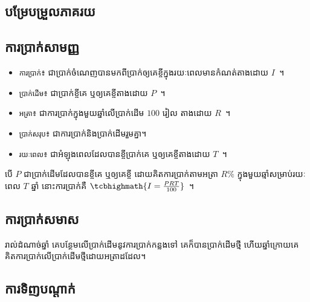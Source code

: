 \documentclass[12pt,a4paper]{pptec}
\begin{document}
    \subsection{បម្រែបម្រួលភាគរយ}
    \subsection{ការប្រាក់សាមញ្ញ}
    \begin{tcolorbox}
        \begin{itemize}
            \item \texttt{ការប្រាក់}៖ ជាប្រាក់ចំណេញបានមកពីប្រាក់ឲ្យគេខ្ចីក្នុងរយៈពេលមានកំណត់តាងដោយ $ I $~។
            \item \texttt{ប្រាក់ដើម}៖ ជាប្រាក់ខ្ចីគេ ឬឲ្យគេខ្ចីតាងដោយ $ P $~។
            \item \texttt{អត្រា}៖ ជាការប្រាក់ក្នុងមួយឆ្នាំលើប្រាក់ដើម $ 100 $ រៀល តាងដោយ $ R $~។
            \item \texttt{ប្រាក់សរុប}៖ ជាការប្រាក់និងប្រាក់ដើមរួមគ្នា។
            \item \texttt{រយៈពេល}៖ ជាអំឡុងពេលដែលបានខ្ចីប្រាក់គេ ឬឲ្យគេខ្ចីតាងដោយ $ T $~។
        \end{itemize}
    \end{tcolorbox}
    \begin{tcolorbox}[title={ការប្រាក់សាមញ្ញ}]
        បើ $ P $ ជាប្រាក់ដើមដែលបានខ្ចីគេ ឬឲ្យគេខ្ចី ដោយគិតការប្រាក់តាមអត្រា $ R\% $ ក្នុងមួយឆ្មាំសម្រាប់រយៈពេល $ T $ ឆ្នាំ នោះការប្រាក់គឺ $ \tcbhighmath{I=\frac{PRT}{100}} $~។
    \end{tcolorbox}
    \subsection{ការប្រាក់សមាស}
    \begin{tcolorbox}[title={ការប្រាក់សមាស}]
        រាល់ដំណាច់ឆ្នាំ គេបន្ថែមលើប្រាក់ដើមនូវការប្រាក់កន្លងទៅ គេក៏បានប្រាក់ដើមថ្មី ហើយឆ្នាំក្រោយគេគិតការប្រាក់លើប្រាក់ដើមថ្មីដោយអត្រាដដែល។
    \end{tcolorbox}
    \subsection{ការទិញបណ្ដាក់}
\end{document}
